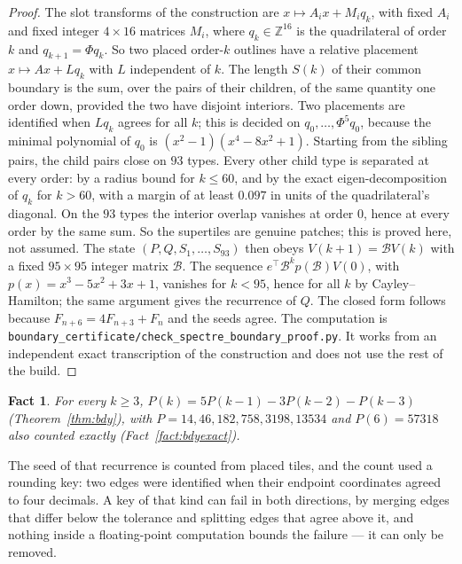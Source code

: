 \documentclass[11pt]{article}
\newtheorem{fact}{Fact}
\theoremstyle{definition}
\theoremstyle{remark}
\newcommand{\code}[1]{\texttt{#1}}
\begin{document}
\begin{proof}
The slot transforms of the construction are $x\mapsto A_{i}x+M_{i}q_{k}$, with fixed $A_{i}$ and
fixed integer $4\times16$ matrices $M_{i}$, where $q_{k}\in\mathbb{Z}^{16}$ is the quadrilateral of
order $k$ and $q_{k+1}=\Phi q_{k}$.  So two placed order-$k$ outlines have a relative placement
$x\mapsto Ax+Lq_{k}$ with $L$ independent of $k$.  The length $S(k)$ of their common boundary is the
sum, over the pairs of their children, of the same quantity one order down, provided the two have
disjoint interiors.  Two placements are identified when $Lq_{k}$ agrees for all $k$; this is decided
on $q_{0},\dots,\Phi^{5}q_{0}$, because the minimal polynomial of $q_{0}$ is $(x^{2}-1)(x^{4}-8x^{2}+1)$.
Starting from the sibling pairs, the child pairs close on $93$ types.  Every other child type is
separated at every order: by a radius bound for $k\le60$, and by the exact eigen-decomposition of
$q_{k}$ for $k>60$, with a margin of at least $0.097$ in units of the quadrilateral's diagonal.  On
the $93$ types the interior overlap vanishes at order $0$, hence at every order by the same sum.
So the supertiles are genuine patches; this is proved here, not assumed.  The state
$(P,Q,S_{1},\dots,S_{93})$ then obeys $V(k+1)=\mathcal{B}V(k)$ with a fixed $95\times95$ integer matrix $\mathcal{B}$.
The sequence $e^{\top}\mathcal{B}^{k}p(\mathcal{B})V(0)$, with $p(x)=x^{3}-5x^{2}+3x+1$, vanishes for $k<95$, hence for
all $k$ by Cayley--Hamilton; the same argument gives the recurrence of $Q$.  The closed form follows
because $F_{n+6}=4F_{n+3}+F_{n}$ and the seeds agree.  The computation is
\code{boundary\_certificate/check\_spectre\_boundary\_proof.py}.  It works from an independent exact
transcription of the construction and does not use the rest of the build.
\end{proof}

\begin{fact}
\label{fact:bdyrec}
For every $k\ge3$, $P(k)=5P(k-1)-3P(k-2)-P(k-3)$ (Theorem~\ref{thm:bdy}), with $P=14, 46, 182, 758, 3198, 13534$ and
$P(6)=57318$ also counted exactly (Fact~\ref{fact:bdyexact}).
\end{fact}

\noindent
The seed of that recurrence is counted from placed tiles, and the count used
a rounding key: two edges were identified when their endpoint coordinates
agreed to four decimals.  A key of that kind can fail in both directions, by
merging edges that differ below the tolerance and splitting edges that agree
above it, and nothing inside a floating-point computation bounds the failure
--- it can only be removed.
\end{document}
